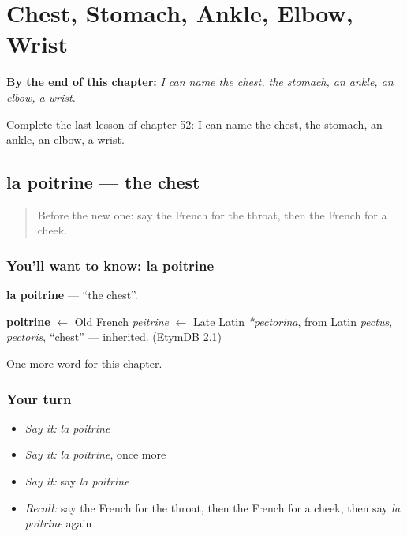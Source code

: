 
\chapter{Chest, Stomach, Ankle, Elbow, Wrist}
\label{ch:fr-chest-stomach-ankle-elbow-wrist}

\begin{chapteropening}
\textbf{By the end of this chapter:} \emph{I can name the chest, the stomach, an ankle, an elbow, a wrist.}

Complete the last lesson of chapter 52: I can name the chest, the stomach, an ankle, an elbow, a wrist.
\end{chapteropening}

\section[la poitrine]{la poitrine — the chest}

\label{lesson:FR-C52-poitrine}



\begin{quote}
Before the new one: say the French for the throat, then the French for a cheek.
\end{quote}

\subsection*{You'll want to know: la poitrine}
\textbf{la poitrine} — \textquotedblleft{}the chest\textquotedblright{}.

\begin{cousinweb}
\textbf{poitrine} $\leftarrow$ Old French \emph{peitrine} $\leftarrow$ Late Latin \emph{*pectorina}, from Latin \emph{pectus}, \emph{pectoris}, \textquotedblleft{}chest\textquotedblright{} — inherited. (EtymDB 2.1)
\end{cousinweb}

\begin{grammarlens}[title={What you've built}]
One more word for this chapter.
\end{grammarlens}

\subsection*{Your turn}
\begin{itemize}
\raggedright
  \item \emph{Say it:} \emph{la poitrine}
  \item \emph{Say it:} \emph{la poitrine}, once more
  \item \emph{Say it:} say \emph{la poitrine}
  \item \emph{Recall:} say the French for the throat, then the French for a cheek, then say \emph{la poitrine} again
\end{itemize}

